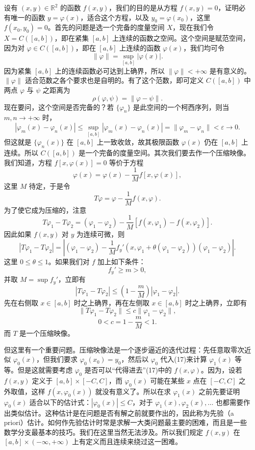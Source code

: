设有 $(x,y)\in\mathbb R^2$ 的函数 $f(x,y)$，我们的目的是从方程 $f(x,y)=0$，证明必有唯一的函数 $y=\varphi(x)$，适合这个方程，以及 $y_0=\varphi(x_0)$，这里 $f(x_0,y_0)=0$。首先的问题是选一个完备的度量空间 $X$，现在我们令 $X=C([a,b])$，即在紧集 $[a,b]$ 上连续的函数之空间。这个空间是赋范空间，因为对 $\varphi\in C([a,b])$，即在 $[a,b]$ 上连续的函数 $\varphi(x)$，我们均可令
\begin{equation}
 \|\varphi\|=\sup_{[a,b]}|\varphi(x)|.
 \tag{15}
\end{equation}
因为紧集 $[a,b]$ 上的连续函数必可达到上确界，所以 $\|\varphi\|<+\infty$ 是有意义的。$\|\varphi\|$ 适合范数之各个要求也是自明的。有了这个范数，即可定义 $C([a,b])$ 中两点 $\varphi$ 与 $\psi$ 之距离为
\[
 \rho(\varphi,\psi)=\|\varphi-\psi\|.
\]
现在要问，这个空间是否完备的？若 $\{\varphi_n\}$ 是此空间的一个柯西序列，则当 $m,n\to+\infty$ 时，
\[
 |\varphi_m(x)-\varphi_n(x)|\le\sup_{[a,b]}|\varphi_m(x)-\varphi_n(x)|=\|\varphi_m-\varphi_n\|<\varepsilon\to0.
\]
但这就是 $\{\varphi_n(x)\}$ 在 $[a,b]$ 上一致收敛，故其极限函数 $\varphi(x)$ 仍在 $[a,b]$ 上连续。所以 $C([a,b])$ 是一个完备的度量空间。其次我们要去作一个压缩映像。我们知道，方程 $f[x,\varphi(x)]=0$ 等价于方程
\begin{equation}
 \varphi(x)=\varphi(x)-\frac1M f[x,\varphi(x)],
 \tag{16}
\end{equation}
这里 $M$ 待定，于是令
\begin{equation}
 T\varphi=\varphi-\frac1M f(x,\varphi).
 \tag{17}
\end{equation}
为了使它成为压缩的，注意
\[
 T\varphi_1-T\varphi_2=(\varphi_1-\varphi_2)-\frac1M[f(x,\varphi_1)-f(x,\varphi_2)].
\]
因此如果 $f(x,y)$ 对 $y$ 为连续可微，则
\[
 |T\varphi_1-T\varphi_2|
 =\left|(\varphi_1-\varphi_2)-\frac1M f_y'(x,\varphi_1+\theta(\varphi_1-\varphi_2))(\varphi_1-\varphi_2)\right|.
\]
这里 $0\le\theta\le1$。如果我们对 $f$ 加上如下条件：
\[
 f_y'\ge m>0,
\]
并取 $M=\sup f_y'$，立即有
\[
 |T\varphi_1-T\varphi_2|\le\left(1-\frac mM\right)|\varphi_1-\varphi_2|.
\]
先在右侧取 $x\in[a,b]$ 时之上确界，再在左侧取 $x\in[a,b]$ 时之上确界，立即有
\[
 \|T\varphi_1-T\varphi_2\|\le c\|\varphi_1-\varphi_2\|,
\]
\[
 0<c=1-\frac mM<1.
\]
而 $T$ 是一个压缩映像。

但这里有一个重要问题。压缩映像法是一个逐步逼近的迭代过程：先任意取零次近似 $\varphi_0(x)$，但我们要求 $\varphi_0(x_0)=y_0$，然后以 $\varphi_0$ 代入(17)来计算 $\varphi_1(x)$ 等等。但是这就需要考虑 $\varphi_0$ 是否可以“代得进去”(17)中的 $f(x,\varphi)$。因为，设若 $f(x,y)$ 定义于 $[a,b]\times[-C,C]$，而 $\varphi_0(x)$ 可能在某些 $x$ 点在 $[-C,C]$ 之外取值，这样 $f(x,\varphi_0(x))$ 就没有意义了。所以在求 $\varphi_1(x)$ 之前先要证明 $\varphi_0(x)$ 适合以下的估计式：$|\varphi_0(x)|\le C$，对于 $\varphi_1(x),\varphi_2(x),\ldots$ 也都需要作出类似估计。这种估计是在问题是否有解之前就要作出的，因此称为先验（a priori）估计。如何作先验估计时常是求解一大类问题最主要的困难，而且是一些数学分支最基本的技巧。我们在这里当然无法涉及。所以我们规定 $f(x,y)$ 在 $[a,b]\times(-\infty,+\infty)$ 上有定义而且连续来绕过这一困难。

